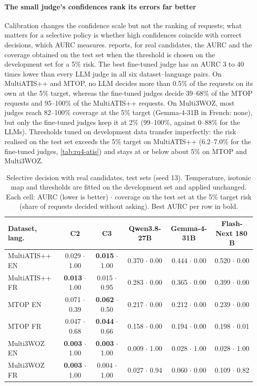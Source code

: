 \paragraph{The small judge's confidences rank its errors far better} Calibration changes the confidence scale but not the ranking of requests; what matters for a selective policy is whether high confidences coincide with correct decisions, which AURC measures.  reports, for real candidates, the AURC and the coverage obtained on the test set when the threshold is chosen on the development set for a 5\% risk. The best fine-tuned judge has an AURC 3 to 40 times lower than every LLM judge in all six dataset--language pairs. On MultiATIS++ and MTOP, no LLM decides more than 0.5\% of the requests on its own at the 5\% target, whereas the fine-tuned judges decide 39--68\% of the MTOP requests and 95--100\% of the MultiATIS++ requests. On Multi3WOZ, most judges reach 82--100\% coverage at the 5\% target (Gemma-4-31B in French: none), but only the fine-tuned judges keep it at 2\% (99--100\%, against 0--88\% for the LLMs). Thresholds tuned on development data transfer imperfectly: the risk realised on the test set exceeds the 5\% target on MultiATIS++ (6.2--7.0\% for the fine-tuned judges, \cref{tab:rq4-atis}) and stays at or below about 5\% on MTOP and Multi3WOZ.

\begin{table}[pos=t]
\centering
\small
\caption{Selective decision with real candidates, test sets (seed 13). Temperature, isotonic map and thresholds are fitted on the development set and applied unchanged. Each cell: AURC (lower is better) $\cdot$ coverage on the test set at the 5\% target risk (share of requests decided without asking). Best AURC per row in bold.}
\label{tab:rq4}
\setlength{\tabcolsep}{3pt}
\begin{tabular}{@{}lccccc@{}}
\toprule
Dataset, lang. & C2 & C3 & Qwen3.8-27B & Gemma-4-31B & Flash-Next 180\,B \\
\midrule
MultiATIS++ EN & 0.029 $\cdot$ 1.00 & \textbf{0.015} $\cdot$ 1.00 & 0.370 $\cdot$ 0.00 & 0.444 $\cdot$ 0.00 & 0.520 $\cdot$ 0.00 \\
MultiATIS++ FR & \textbf{0.013} $\cdot$ 1.00 & 0.015 $\cdot$ 0.95 & 0.283 $\cdot$ 0.00 & 0.365 $\cdot$ 0.00 & 0.399 $\cdot$ 0.00 \\
MTOP EN        & 0.071 $\cdot$ 0.39 & \textbf{0.062} $\cdot$ 0.50 & 0.217 $\cdot$ 0.00 & 0.212 $\cdot$ 0.00 & 0.239 $\cdot$ 0.00 \\
MTOP FR        & 0.047 $\cdot$ 0.68 & \textbf{0.044} $\cdot$ 0.66 & 0.158 $\cdot$ 0.00 & 0.194 $\cdot$ 0.00 & 0.198 $\cdot$ 0.01 \\
Multi3WOZ EN   & \textbf{0.003} $\cdot$ 1.00 & \textbf{0.003} $\cdot$ 1.00 & 0.009 $\cdot$ 1.00 & 0.028 $\cdot$ 1.00 & 0.028 $\cdot$ 1.00 \\
Multi3WOZ FR   & \textbf{0.003} $\cdot$ 1.00 & 0.004 $\cdot$ 1.00 & 0.027 $\cdot$ 0.94 & 0.060 $\cdot$ 0.00 & 0.109 $\cdot$ 0.82 \\
\bottomrule
\end{tabular}
\end{table}

